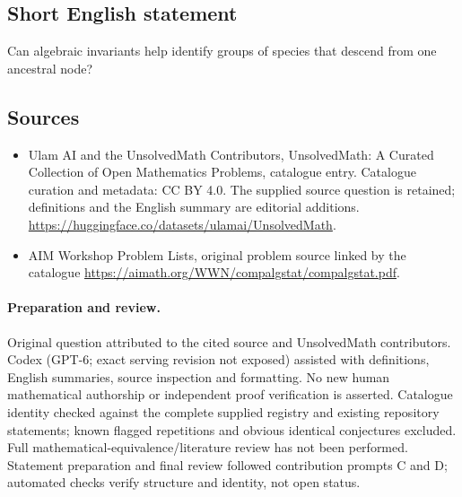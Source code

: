 \documentclass[11pt]{article}
\begin{document}
\subsection{Short English statement}
Can algebraic invariants help identify groups of species that descend from one ancestral node?
\subsection{Sources}
\begin{itemize}
\item[\hypertarget{source:statement:1}{S1}] Ulam AI and the UnsolvedMath Contributors, UnsolvedMath: A Curated Collection of Open Mathematics Problems, catalogue entry. Catalogue curation and metadata: CC BY 4.0. The supplied source question is retained; definitions and the English summary are editorial additions.
\url{https://huggingface.co/datasets/ulamai/UnsolvedMath}.
\item[\hypertarget{source:statement:2}{S2}] AIM Workshop Problem Lists, original problem source linked by the catalogue
\url{https://aimath.org/WWN/compalgstat/compalgstat.pdf}.
\end{itemize}
\paragraph{Preparation and review.}
Original question attributed to the cited source and UnsolvedMath contributors. Codex (GPT-6; exact serving revision not exposed) assisted with definitions, English summaries, source inspection and formatting. No new human mathematical authorship or independent proof verification is asserted. Catalogue identity checked against the complete supplied registry and existing repository statements; known flagged repetitions and obvious identical conjectures excluded. Full mathematical-equivalence/literature review has not been performed. Statement preparation and final review followed contribution prompts C and D; automated checks verify structure and identity, not open status.
\label{end:statement}
\end{document}

